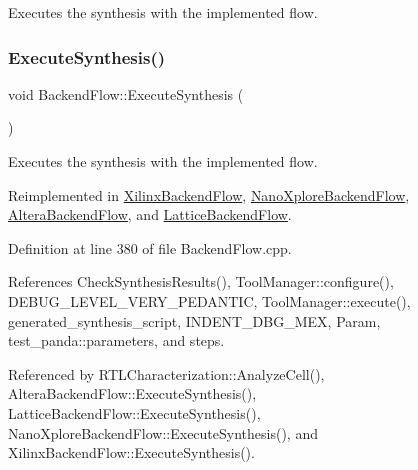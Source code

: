 Executes the synthesis with the implemented flow. 

\mbox{\label{classBackendFlow_af0e8f1973185540298eaa3ac4bee3b2c}} 
\subsubsection{\texorpdfstring{Execute\+Synthesis()}{ExecuteSynthesis()}}
{\footnotesize\ttfamily void Backend\+Flow\+::\+Execute\+Synthesis (\begin{DoxyParamCaption}{ }\end{DoxyParamCaption})\hspace{0.3cm}{\ttfamily [virtual]}}



Executes the synthesis with the implemented flow. 



Reimplemented in \hyperlink{classXilinxBackendFlow_a006b64153e4e8498948c37522fc24b0f}{Xilinx\+Backend\+Flow}, \hyperlink{classNanoXploreBackendFlow_a068c9327512c0a9f5524433ebb52fde7}{Nano\+Xplore\+Backend\+Flow}, \hyperlink{classAlteraBackendFlow_a02d5cfd65ba8c97fd8b3c9781014c22c}{Altera\+Backend\+Flow}, and \hyperlink{classLatticeBackendFlow_adc9bf997d1ac830c4511521b1934bffc}{Lattice\+Backend\+Flow}.



Definition at line 380 of file Backend\+Flow.\+cpp.



References Check\+Synthesis\+Results(), Tool\+Manager\+::configure(), D\+E\+B\+U\+G\+\_\+\+L\+E\+V\+E\+L\+\_\+\+V\+E\+R\+Y\+\_\+\+P\+E\+D\+A\+N\+T\+IC, Tool\+Manager\+::execute(), generated\+\_\+synthesis\+\_\+script, I\+N\+D\+E\+N\+T\+\_\+\+D\+B\+G\+\_\+\+M\+EX, Param, test\+\_\+panda\+::parameters, and steps.



Referenced by R\+T\+L\+Characterization\+::\+Analyze\+Cell(), Altera\+Backend\+Flow\+::\+Execute\+Synthesis(), Lattice\+Backend\+Flow\+::\+Execute\+Synthesis(), Nano\+Xplore\+Backend\+Flow\+::\+Execute\+Synthesis(), and Xilinx\+Backend\+Flow\+::\+Execute\+Synthesis().

